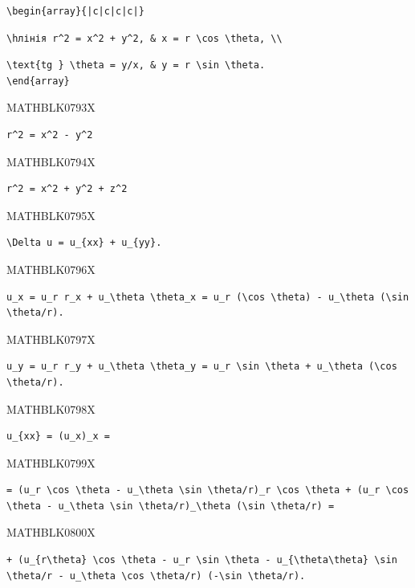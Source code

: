 \documentclass[
  ukrainian,
]{article}
\begin{document}
\begin{verbatim}
\begin{array}{|c|c|c|c|}
\end{verbatim}

\begin{verbatim}
\hлінія r^2 = x^2 + y^2, & x = r \cos \theta, \\
\end{verbatim}

\begin{verbatim}
\text{tg } \theta = y/x, & y = r \sin \theta.
\end{array}
\end{verbatim}

MATHBLK0793X

\begin{verbatim}
r^2 = x^2 - y^2
\end{verbatim}

MATHBLK0794X

\begin{verbatim}
r^2 = x^2 + y^2 + z^2
\end{verbatim}

MATHBLK0795X

\begin{verbatim}
\Delta u = u_{xx} + u_{yy}.
\end{verbatim}

MATHBLK0796X

\begin{verbatim}
u_x = u_r r_x + u_\theta \theta_x = u_r (\cos \theta) - u_\theta (\sin \theta/r).
\end{verbatim}

MATHBLK0797X

\begin{verbatim}
u_y = u_r r_y + u_\theta \theta_y = u_r \sin \theta + u_\theta (\cos \theta/r).
\end{verbatim}

MATHBLK0798X

\begin{verbatim}
u_{xx} = (u_x)_x =
\end{verbatim}

MATHBLK0799X

\begin{verbatim}
= (u_r \cos \theta - u_\theta \sin \theta/r)_r \cos \theta + (u_r \cos \theta - u_\theta \sin \theta/r)_\theta (\sin \theta/r) =
\end{verbatim}

MATHBLK0800X

\begin{verbatim}
+ (u_{r\theta} \cos \theta - u_r \sin \theta - u_{\theta\theta} \sin \theta/r - u_\theta \cos \theta/r) (-\sin \theta/r).
\end{verbatim}
\end{document}
